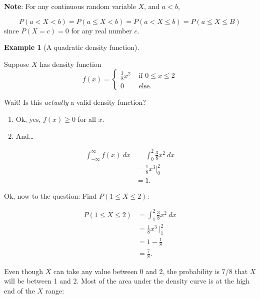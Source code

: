 \documentclass[
]{book}
\providecommand{\tightlist}{%
  \setlength{\itemsep}{0pt}\setlength{\parskip}{0pt}}
\theoremstyle{definition}
\theoremstyle{definition}
\newtheorem{example}{Example}[chapter]
\theoremstyle{definition}
\theoremstyle{definition}
\theoremstyle{remark}
\begin{document}
\textbf{Note}: For any continuous random variable \(X\), and \(a < b\),

\[P(a < X < b) = P(a \leq X < b) = P(a < X \leq b) = P(a \leq X \leq B)\] since \(P(X = c) = 0\) for any real number \(c\).

\begin{example}[A quadratic density function]
\protect\hypertarget{exm:cont-quad-rv}{}\label{exm:cont-quad-rv}

Suppose \(X\) has density function
\[
f(x)=
\begin{cases}
\frac{3}{8}x^2 &\text{ if }0 \leq x \leq 2 \\
0 &\text{ else.}
\end{cases}
\]

Wait! Is this \emph{actually} a valid density function?

\begin{enumerate}
\def\labelenumi{\arabic{enumi}.}
\tightlist
\item
  Ok, yes, \(f(x) \geq 0\) for all \(x\).
\item
  And\ldots{}
\end{enumerate}

\begin{align*}
\int_{-\infty}^{\infty} f(x) ~dx &= \int_0^2 \frac{3}{8} x^2~dx \\
                            &= \frac{1}{8} x^3 \Big|_0^2 \\
                            &= 1.
\end{align*}

Ok, now to the question: Find \(P(1 \leq X \leq 2)\):

\begin{align*}
 P(1 \leq X \leq 2)   &= \int_1^2 \frac{3}{8} x^2~dx \\
                      &= \frac{1}{8} x^3 ~\biggr|_1^2 \\
                      &= 1 - \frac{1}{8} \\
                      &= \frac{7}{8}.
\end{align*}

Even though \(X\) can take any value between 0 and 2, the probability is 7/8 that \(X\) will be between 1 and 2. Most of the area under the density curve is at the high end of the \(X\) range:


\end{example}
\end{document}
